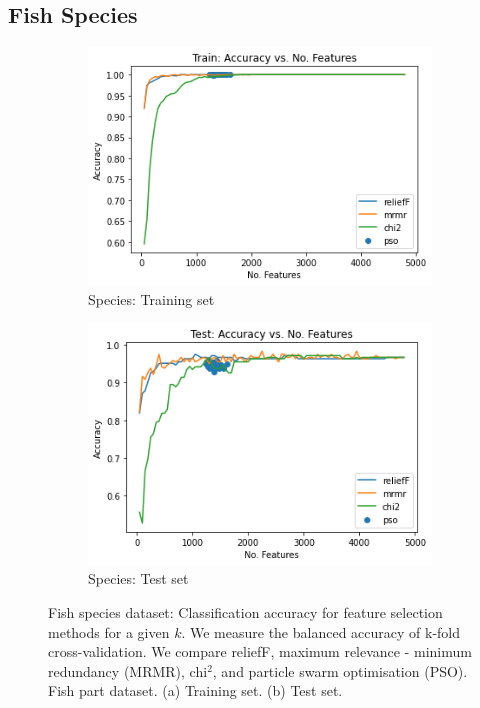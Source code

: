 \documentclass[runningheads]{llncs}
\begin{document}
\subsection{Fish Species}

\begin{figure}[htb]
  \centering
  \begin{subfigure}[b]{.55\linewidth}
    \includegraphics[width=\linewidth]{accuracy-features-fish-train.png}
    \caption{Species: Training set}\label{fig:accuracy-features-fish-train}
  \end{subfigure}
  \begin{subfigure}[b]{.55\linewidth}
    \includegraphics[width=\linewidth]{accuracy-features-fish-test.png}
    \caption{Species: Test set}\label{fig:accuracy-features-fish-test}
  \end{subfigure}
  \caption[Two numerical solutions]{
    Fish species dataset: Classification accuracy for feature selection methods for a given $k$.
    We measure the balanced accuracy of k-fold cross-validation.
    We compare reliefF, maximum relevance - minimum redundancy (MRMR), chi$^2$, and particle swarm optimisation (PSO).
    Fish part dataset. (a) Training set. (b) Test set.}
  \label{fig:animals}
\end{figure}
\end{document}
